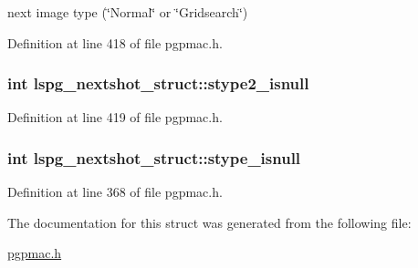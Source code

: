 next image type (\char`\"{}\-Normal\char`\"{} or \char`\"{}\-Gridsearch\char`\"{}) 



Definition at line 418 of file pgpmac.\-h.

\hypertarget{structlspg__nextshot__struct_a203e29ed0bb403aaab6d7f95f690cc0d}{
\subsubsection[{stype2\-\_\-isnull}]{\setlength{\rightskip}{0pt plus 5cm}int lspg\-\_\-nextshot\-\_\-struct\-::stype2\-\_\-isnull}}\label{structlspg__nextshot__struct_a203e29ed0bb403aaab6d7f95f690cc0d}


Definition at line 419 of file pgpmac.\-h.

\hypertarget{structlspg__nextshot__struct_a79f48c452a4aca8506bae22f897c7441}{
\subsubsection[{stype\-\_\-isnull}]{\setlength{\rightskip}{0pt plus 5cm}int lspg\-\_\-nextshot\-\_\-struct\-::stype\-\_\-isnull}}\label{structlspg__nextshot__struct_a79f48c452a4aca8506bae22f897c7441}


Definition at line 368 of file pgpmac.\-h.



The documentation for this struct was generated from the following file\-:\begin{DoxyCompactItemize}
\item 
\hyperlink{pgpmac_8h}{pgpmac.\-h}\end{DoxyCompactItemize}
